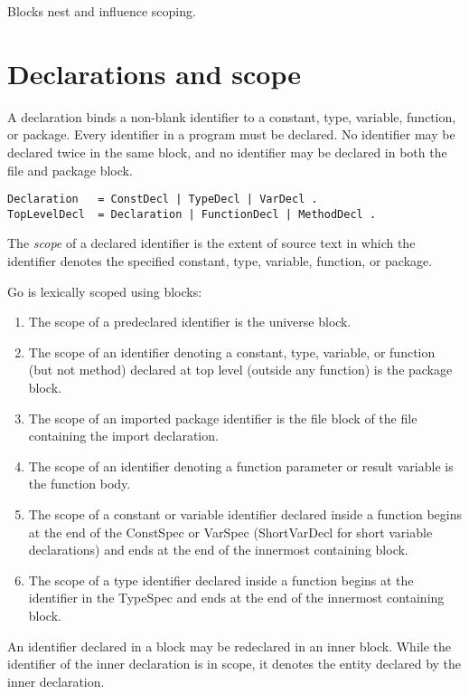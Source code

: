 Blocks nest and influence scoping.

\section*{Declarations and scope}

A declaration binds a non-blank identifier
to a constant, type, variable, function, or package. Every identifier in
a program must be declared. No identifier may be declared twice in the
same block, and no identifier may be declared in both the file and
package block.

\begin{Verbatim}[frame=single]
Declaration   = ConstDecl | TypeDecl | VarDecl .
TopLevelDecl  = Declaration | FunctionDecl | MethodDecl .
\end{Verbatim}

The \emph{scope} of a declared identifier is the extent of source text
in which the identifier denotes the specified constant, type, variable,
function, or package.

Go is lexically scoped using blocks:

\begin{enumerate}
\item
  The scope of a predeclared identifier is the universe block.
\item
  The scope of an identifier denoting a constant, type, variable, or
  function (but not method) declared at top level (outside any function)
  is the package block.
\item
  The scope of an imported package identifier is the file block of the
  file containing the import declaration.
\item
  The scope of an identifier denoting a function parameter or result
  variable is the function body.
\item
  The scope of a constant or variable identifier declared inside a
  function begins at the end of the ConstSpec or VarSpec (ShortVarDecl
  for short variable declarations) and ends at the end of the innermost
  containing block.
\item
  The scope of a type identifier declared inside a function begins at
  the identifier in the TypeSpec and ends at the end of the innermost
  containing block.
\end{enumerate}

An identifier declared in a block may be redeclared in an inner block.
While the identifier of the inner declaration is in scope, it denotes
the entity declared by the inner declaration.

